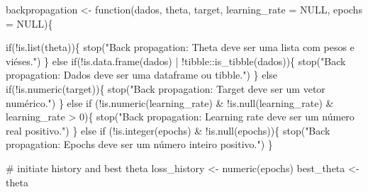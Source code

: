 \documentclass[
  a4paperpaper,
]{article}
\newenvironment{Shaded}{\begin{snugshade}}{\end{snugshade}}
\newcommand{\AttributeTok}[1]{\textcolor[rgb]{0.40,0.45,0.13}{#1}}
\newcommand{\CommentTok}[1]{\textcolor[rgb]{0.37,0.37,0.37}{#1}}
\newcommand{\ConstantTok}[1]{\textcolor[rgb]{0.56,0.35,0.01}{#1}}
\newcommand{\ControlFlowTok}[1]{\textcolor[rgb]{0.00,0.23,0.31}{#1}}
\newcommand{\DecValTok}[1]{\textcolor[rgb]{0.68,0.00,0.00}{#1}}
\newcommand{\FunctionTok}[1]{\textcolor[rgb]{0.28,0.35,0.67}{#1}}
\newcommand{\NormalTok}[1]{\textcolor[rgb]{0.00,0.23,0.31}{#1}}
\newcommand{\OtherTok}[1]{\textcolor[rgb]{0.00,0.23,0.31}{#1}}
\newcommand{\SpecialCharTok}[1]{\textcolor[rgb]{0.37,0.37,0.37}{#1}}
\newcommand{\StringTok}[1]{\textcolor[rgb]{0.13,0.47,0.30}{#1}}
\begin{document}
\begin{Shaded}
\begin{Highlighting}[]
\NormalTok{backpropagation }\OtherTok{\textless{}{-}} \ControlFlowTok{function}\NormalTok{(dados, theta, target, }\AttributeTok{learning\_rate =} \ConstantTok{NULL}\NormalTok{, }\AttributeTok{epochs =} \ConstantTok{NULL}\NormalTok{)\{}
  
  \ControlFlowTok{if}\NormalTok{(}\SpecialCharTok{!}\FunctionTok{is.list}\NormalTok{(theta))\{}
    \FunctionTok{stop}\NormalTok{(}\StringTok{"Back propagation: Theta deve ser uma lista com pesos e viéses."}\NormalTok{)}
\NormalTok{  \} }\ControlFlowTok{else} \ControlFlowTok{if}\NormalTok{(}\SpecialCharTok{!}\FunctionTok{is.data.frame}\NormalTok{(dados) }\SpecialCharTok{|} \SpecialCharTok{!}\NormalTok{tibble}\SpecialCharTok{::}\FunctionTok{is\_tibble}\NormalTok{(dados))\{}
    \FunctionTok{stop}\NormalTok{(}\StringTok{"Back propagation: Dados deve ser uma dataframe ou tibble."}\NormalTok{)}
\NormalTok{  \} }\ControlFlowTok{else} \ControlFlowTok{if}\NormalTok{(}\SpecialCharTok{!}\FunctionTok{is.numeric}\NormalTok{(target))\{}
    \FunctionTok{stop}\NormalTok{(}\StringTok{"Back propagation: Target deve ser um vetor numérico."}\NormalTok{)}
\NormalTok{  \} }\ControlFlowTok{else} \ControlFlowTok{if}\NormalTok{ (}\SpecialCharTok{!}\FunctionTok{is.numeric}\NormalTok{(learning\_rate) }\SpecialCharTok{\&} \SpecialCharTok{!}\FunctionTok{is.null}\NormalTok{(learning\_rate) }\SpecialCharTok{\&}\NormalTok{ learning\_rate }\SpecialCharTok{\textgreater{}} \DecValTok{0}\NormalTok{)\{}
    \FunctionTok{stop}\NormalTok{(}\StringTok{"Back propagation: Learning rate deve ser um número real positivo."}\NormalTok{)}
\NormalTok{  \} }\ControlFlowTok{else} \ControlFlowTok{if}\NormalTok{ (}\SpecialCharTok{!}\FunctionTok{is.integer}\NormalTok{(epochs) }\SpecialCharTok{\&} \SpecialCharTok{!}\FunctionTok{is.null}\NormalTok{(epochs))\{}
    \FunctionTok{stop}\NormalTok{(}\StringTok{"Back propagation: Epochs deve ser um número inteiro positivo."}\NormalTok{)}
\NormalTok{  \}}
  
\CommentTok{\# initiate history and best theta}
\NormalTok{loss\_history }\OtherTok{\textless{}{-}} \FunctionTok{numeric}\NormalTok{(epochs)}
\NormalTok{best\_theta }\OtherTok{\textless{}{-}}\NormalTok{ theta}


\end{Highlighting}
\end{Shaded}
\end{document}
